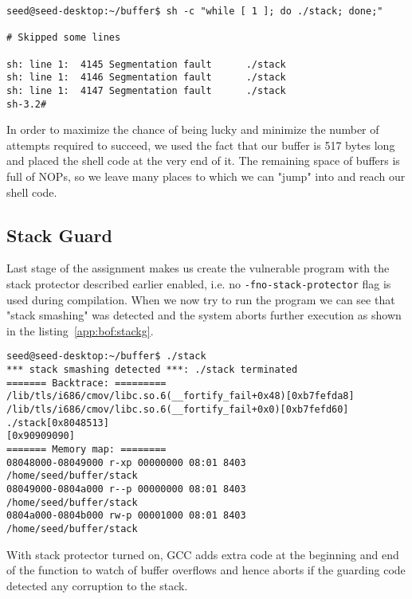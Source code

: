 \documentclass[12pt, a4paper, pdflatex]{article}
\begin{document}
\vspace{1em}
\lstset{
	captionpos=b,
	frame=single,
	language=BASH,
	breaklines=true,
	caption=Getting root access with address space randomization,
	label=bof:loop,
  float=tb
}
\begin{lstlisting}
seed@seed-desktop:~/buffer$ sh -c "while [ 1 ]; do ./stack; done;"

# Skipped some lines

sh: line 1:  4145 Segmentation fault      ./stack
sh: line 1:  4146 Segmentation fault      ./stack
sh: line 1:  4147 Segmentation fault      ./stack
sh-3.2# 

\end{lstlisting}

In order to maximize the chance of being lucky and minimize the number of attempts required to succeed, we used the fact that our buffer is 517 bytes long and placed the shell code at the very end of it. The remaining space of buffers is full of NOPs, so we leave many places to which we can "jump" into and reach our shell code.

\subsection{Stack Guard}

Last stage of the assignment makes us create the vulnerable program with the stack protector described earlier enabled, i.e. no \texttt{-fno-stack-protector} flag is used during compilation. When we now try to run the program we can see that "stack smashing" was detected and the system aborts further execution as shown in the listing~\ref{app:bof:stackg}.
\vspace{1em}
\lstset{
	captionpos=b,
	frame=single,
	language=BASH,
	breaklines=true,
	caption=Stack smashing detected,
	label=app:bof:stackg,
}
\begin{lstlisting}
seed@seed-desktop:~/buffer$ ./stack 
*** stack smashing detected ***: ./stack terminated
======= Backtrace: =========
/lib/tls/i686/cmov/libc.so.6(__fortify_fail+0x48)[0xb7fefda8]
/lib/tls/i686/cmov/libc.so.6(__fortify_fail+0x0)[0xb7fefd60]
./stack[0x8048513]
[0x90909090]
======= Memory map: ========
08048000-08049000 r-xp 00000000 08:01 8403       /home/seed/buffer/stack
08049000-0804a000 r--p 00000000 08:01 8403       /home/seed/buffer/stack
0804a000-0804b000 rw-p 00001000 08:01 8403       /home/seed/buffer/stack
\end{lstlisting}

With stack protector turned on, GCC adds extra code at the beginning and end of the function to watch of buffer overflows and hence aborts if the guarding code detected any corruption to the stack\cite{gnu13}.
\end{document}
